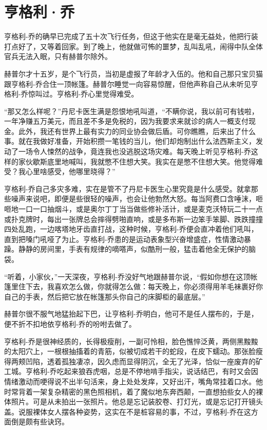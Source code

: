 \chapter{亨格利·乔}
 
    亨格利-乔的确早已完成了五十次飞行任务，但这于他实在是毫无益处，他把行装打点好了，又等着回家。到了晚上，他就做可怖的噩梦，乱叫乱吼，闹得中队全体官兵无法入眠，只有赫普尔除外。

    赫普尔才十五岁，是个飞行员，当初是虚报了年龄才入伍的。他和自己那只宝贝猫跟亨格利-乔合住一顶帐篷。赫普尔睡觉一向容易惊醒，但他声称自己从未听见亨格利-乔惊叫过。亨格利-乔心里觉得难受。

    “那又怎么样呢？”丹尼卡医生满是怨恨地吼叫道，“不瞒你说，我以前可有钱啦，一年净赚五万美元，而且差不多是免税的，因为我要求来就诊的病人一概支付现金。此外，我还有世界上最有实力的同业协会做后盾。可你瞧瞧，后来出了什么事。就在我做好准备，开始积攒一笔钱的当儿，他们却炮制出什么法西斯主义，发动了一场令人悚然的战争，竟连我也没逃脱这场灾难。每天晚上听见亨格利-乔这样的家伙歇斯底里地喊叫，我就憋不住想大笑。我实在是憋不住想大笑。他觉得难受？我心里啥感受，他哪里晓得？”

    亨格利-乔自己多灾多难，实在是管不了丹尼卡医生心里究竟是什么感受。就拿那些噪声来说吧，即便是些很轻的噪声，也会让他勃然大怒。每当阿费口含唾沫，咂咂地一口一口抽烟斗，或是奥尔丁丁当当做些修补活计，或是麦克沃特玩二十一点或扑克牌时，每出一张牌总会摔得劈啪直响，或是多布斯一边笨手笨脚、跌跌撞撞四处乱跑，一边喀塔地牙齿直打战，这种时候，亨格利-乔便会直冲着他们吼叫，直到把嗓门吼哑了为止。亨格利-乔患的是运动表象型兴奋增盛症，性情激动暴躁。静静的房间里，手表有规律的嘀嗒声，似酷刑一般，猛击着他全无保护的脑袋。

    “听着，小家伙，”一天深夜，亨格利-乔没好气地跟赫普尔说，“假如你想在这顶帐篷里住下去，我喜欢怎么做，你就得怎么做：每天晚上，你必须得用羊毛袜裹好你自己的手表，然后把它放在帐篷那头你自己的床脚柜的最底层。”

    赫普尔很不服气地猛抬起下巴，让亨格利-乔明白，他可不是任人摆布的，于是，便不折不扣地依亨格利-乔的吩咐去做了。

 


    亨格利-乔是很神经质的，长得极瘦削，一副可怜相，脸色憔悴泛黄，两侧黑黢黢的太阳穴上，一根根抽搐着的青筋，似被切成若干的蛇段，在皮下蠕动。那张脸瘦得两颊凹陷，透着孤独凄凉，因久虑而显得阴沉，全无了光泽，恰似一座废弃的矿工城。亨格利-乔吃起来狼吞虎咽，总是不停地啃手指尖，说话结巴，有时又会因情绪激动而哽得说不出半句活来，身上处处发痒，又好出汗，嘴角常挂着口水。他时常背着一架复杂精密的黑色照相机，着了魔似地东奔西颠，一直想拍些女人的裸体照片。可是从未拍出一张照片。他总是忘记装胶卷、打灯光，或是忘记打开镜头盖。说服裸体女人摆各种姿势，这实在不是桩容易的事，不过，亨格利-乔在这方面倒是颇有些诀窍。

